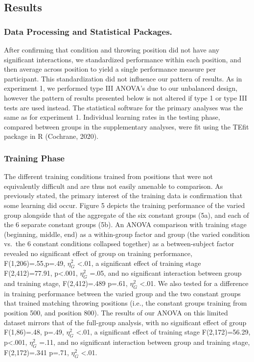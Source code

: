 \documentclass[
  jou, donotrepeattitle,floatsintext]{apa7}
\begin{document}
\hypertarget{results-1}{%
\subsection{Results}\label{results-1}}

\hypertarget{data-processing-and-statistical-packages.}{%
\subsubsection{Data Processing and Statistical Packages.}\label{data-processing-and-statistical-packages.}}

After confirming that condition and throwing position did not have any significant interactions, we standardized performance within each position, and then average across position to yield a single performance measure per participant. This standardization did not influence our pattern of results. As in experiment 1, we performed type III ANOVA's due to our unbalanced design, however the pattern of results presented below is not altered if type 1 or type III tests are used instead. The statistical software for the primary analyses was the same as for experiment 1. Individual learning rates in the testing phase, compared between groups in the supplementary analyses, were fit using the TEfit package in R (Cochrane, 2020).

\hypertarget{training-phase}{%
\subsubsection{Training Phase}\label{training-phase}}

The different training conditions trained from positions that were not equivalently difficult and are thus not easily amenable to comparison. As previously stated, the primary interest of the training data is confirmation that some learning did occur. Figure 5 depicts the training performance of the varied group alongside that of the aggregate of the six constant groups (5a), and each of the 6 separate constant groups (5b). An ANOVA comparison with training stage (beginning, middle, end) as a within-group factor and group (the varied condition vs.~the 6 constant conditions collapsed together) as a between-subject factor revealed no significant effect of group on training performance, F(1,206)=.55,p=.49, \(\eta^{2}_G\) \textless.01, a significant effect of training stage F(2,412)=77.91, p\textless.001, \(\eta^{2}_G\) =.05, and no significant interaction between group and training stage, F(2,412)=.489 p=.61, \(\eta^{2}_G\) \textless.01. We also tested for a difference in training performance between the varied group and the two constant groups that trained matching throwing positions (i.e., the constant groups training from position 500, and position 800). The results of our ANOVA on this limited dataset mirrors that of the full-group analysis, with no significant effect of group F(1,86)=.48, p=.49, \(\eta^{2}_G\) \textless.01, a significant effect of training stage F(2,172)=56.29, p\textless.001, \(\eta^{2}_G\) =.11, and no significant interaction between group and training stage, F(2,172)=.341 p=.71, \(\eta^{2}_G\) \textless.01.
\end{document}
